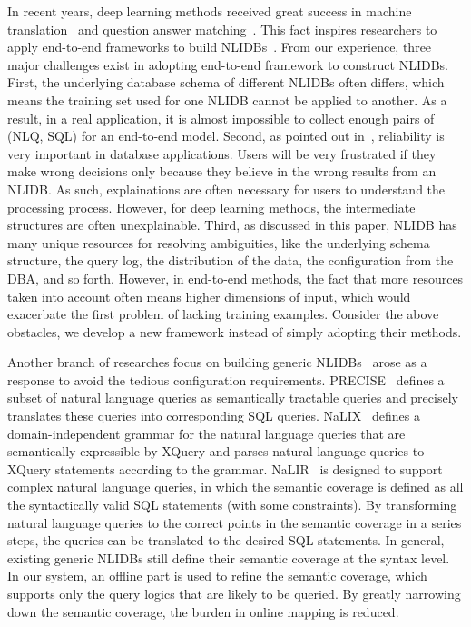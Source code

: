 \documentclass{vldb}
\begin{document}
In recent years, deep learning methods received great success in machine translation~\cite{DBLP:journals/corr/WuSCLNMKCGMKSJL16} and question answer matching~\cite{DBLP:conf/acl/TanSXZ16,DBLP:conf/cikm/FengXZ16}.  This fact inspires researchers to apply end-to-end frameworks to build NLIDBs~\cite{DBLP:conf/acl/DongL16,DBLP:journals/debu/LuLK16,DBLP:journals/cacm/Liang16,DBLP:journals/tacl/ReddyTCKDSL16}.  From our experience, three major challenges exist in adopting end-to-end framework to construct NLIDBs.  First, the underlying database schema of different NLIDBs often differs, which means the training set used for one NLIDB cannot be applied to another.  As a result, in a real application, it is almost impossible to collect enough pairs of (NLQ, SQL) for an end-to-end model.  Second, as pointed out in~\cite{DBLP:conf/iui/PopescuEK03,DBLP:journals/pvldb/LiJ14}, reliability is very important in database applications.  Users will be very frustrated if they make wrong decisions only because they believe in the wrong results from an NLIDB.  As such, explainations are often necessary for users to understand the processing process.  However, for deep learning methods,  the intermediate structures are often unexplainable.  Third, as discussed in this paper, NLIDB has many unique resources for resolving ambiguities, like the underlying schema structure, the query log, the distribution of the data, the configuration from the DBA, and so forth.  However, in end-to-end methods, the fact that more resources taken into account often means higher dimensions of input, which would exacerbate the first problem of lacking training examples.  Consider the above obstacles, we develop a new framework instead of simply adopting their methods.  

Another branch of researches focus on building generic NLIDBs~\cite{DBLP:conf/iui/PopescuEK03,DBLP:conf/coling/PopescuAEKY04,DBLP:journals/tods/LiYJ07,DBLP:journals/pvldb/LiJ14} arose as a response to avoid the tedious configuration requirements.  PRECISE~\cite{DBLP:conf/iui/PopescuEK03,DBLP:conf/coling/PopescuAEKY04} defines a subset of natural language queries as semantically tractable queries and precisely translates these queries into corresponding SQL queries.  NaLIX~\cite{DBLP:conf/sigmod/LiYJ05} defines a domain-independent grammar for the natural language queries that are semantically expressible by XQuery and parses natural language queries to XQuery statements according to the grammar.  NaLIR~\cite{DBLP:journals/pvldb/LiJ14} is designed to support complex natural language queries, in which the semantic coverage is defined as all the syntactically valid SQL statements (with some constraints).  By transforming natural language queries to the correct points in the semantic coverage in a series steps, the queries can be translated to the desired SQL statements.  In general, existing generic NLIDBs still define their semantic coverage at the syntax level.  In our system, an offline part is used to refine the semantic coverage, which supports only the query logics that are likely to be queried.  By greatly narrowing down the semantic coverage, the burden in online mapping is reduced.  
\end{document}
